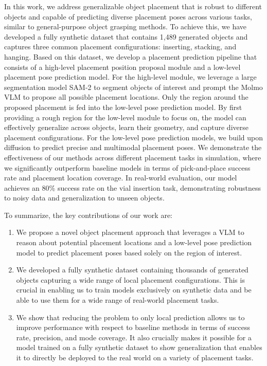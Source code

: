 In this work, we address generalizable object placement that is robust to different objects and capable of predicting diverse placement poses across various tasks, similar to general-purpose object grasping methods. To achieve this, we have developed a fully synthetic dataset that contains 1,489 generated objects and captures three common placement configurations: inserting, stacking, and hanging. Based on this dataset, we develop a placement prediction pipeline that consists of a high-level placement position proposal module and a low-level placement pose prediction model. For the high-level module, we leverage a large segmentation model SAM-2 \cite{ravi2024sam} to segment objects of interest and prompt the Molmo VLM \cite{deitke2024molmopixmoopenweights} to propose all possible placement locations. Only the region around the proposed placement is fed into the low-level pose prediction model. By first providing a rough region for the low-level module to focus on, the model can effectively generalize across objects, learn their geometry, and capture diverse placement configurations. For the low-level pose prediction models, we build upon diffusion to predict precise and multimodal placement poses. We demonstrate the effectiveness of our methods across different placement tasks in simulation, where we significantly outperform baseline models in terms of pick-and-place success rate and placement location coverage. In real-world evaluation, our model achieves an 80\% success rate on the vial insertion task, demonstrating robustness to noisy data and generalization to unseen objects. 



To summarize, the key contributions of our work are: 
\begin{enumerate}
  \item We propose a novel object placement approach that leverages a VLM to reason about potential placement locations and a low-level pose prediction model to predict placement poses based solely on the region of interest.
  \item We developed a fully synthetic dataset containing thousands of generated objects capturing a wide range of local placement configurations. This is crucial in enabling us to train models exclusively on synthetic data and be able to use them for a wide range of real-world placement tasks.
  \item We show that reducing the problem to only local prediction allows us to improve performance with respect to baseline methods in terms of success rate, precision, and mode coverage. It also crucially makes it possible for a model trained on a fully synthetic dataset to show generalization that enables it to directly be deployed to the real world on a variety of placement tasks.
\end{enumerate}

